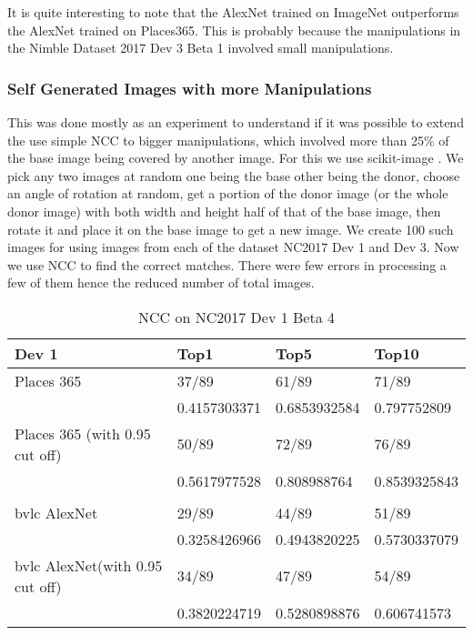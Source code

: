 \documentclass{article}
\begin{document}
It is quite interesting to note that the AlexNet trained on ImageNet outperforms the AlexNet trained on Places365. This is probably because the manipulations in the Nimble Dataset 2017 Dev 3 Beta 1 involved small manipulations.

\subsubsection{Self Generated Images with more Manipulations}
This was done mostly as an experiment to understand if it was possible to extend the use simple NCC to bigger manipulations, which involved more than 25\% of the base image being covered by another image. For this we use scikit-image \cite{scikit-image}. We pick any two images at random one being the base other being the donor, choose an angle of rotation at random, get a portion of the donor image (or the whole donor image) with both width and height half of that of the base image, then rotate it and place it on the base image to get a new image. We create 100 such images for using images from  each of the dataset NC2017 Dev 1 and Dev 3. Now we use NCC to find the correct matches. There were few errors in processing a few of them hence the reduced number of total images.

\begin{table}[H]
\centering
\caption{NCC on NC2017 Dev 1 Beta 4}
\label{sg_dev1}
\begin{tabular}{|l|l|l|l|}
\hline
      Dev 1                         & Top1         & Top5         & Top10        \\ \hline
Places 365                     & 37/89        & 61/89        & 71/89        \\ \hline
                               & 0.4157303371 & 0.6853932584 & 0.797752809  \\ \hline
Places 365 (with 0.95 cut off) & 50/89        & 72/89        & 76/89        \\ \hline
                               & 0.5617977528 & 0.808988764  & 0.8539325843 \\ \hline
                               &              &              &              \\ \hline
bvlc AlexNet                           & 29/89        & 44/89        & 51/89        \\ \hline
                               & 0.3258426966 & 0.4943820225 & 0.5730337079 \\ \hline
bvlc AlexNet(with 0.95 cut off)       & 34/89        & 47/89        & 54/89        \\ \hline
                               & 0.3820224719 & 0.5280898876 & 0.606741573  \\ \hline
\end{tabular}
\end{table}
\end{document}
